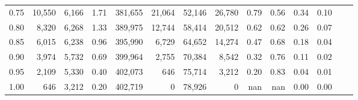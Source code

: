 \begin{tabular}{rrrrrrrrrrrrrr}
0.75 &  10,550 &  6,166 &    1.71 &  381,655 &   21,064 &  52,146 &  26,780 &  0.79 &  0.56 &  0.34 &      0.10 \\
0.80 &   8,320 &  6,268 &    1.33 &  389,975 &   12,744 &  58,414 &  20,512 &  0.62 &  0.62 &  0.26 &      0.07 \\
0.85 &   6,015 &  6,238 &    0.96 &  395,990 &    6,729 &  64,652 &  14,274 &  0.47 &  0.68 &  0.18 &      0.04 \\
0.90 &   3,974 &  5,732 &    0.69 &  399,964 &    2,755 &  70,384 &   8,542 &  0.32 &  0.76 &  0.11 &      0.02 \\
0.95 &   2,109 &  5,330 &    0.40 &  402,073 &      646 &  75,714 &   3,212 &  0.20 &  0.83 &  0.04 &      0.01 \\
1.00 &     646 &  3,212 &    0.20 &  402,719 &        0 &  78,926 &       0 &   nan &   nan &  0.00 &      0.00 \\
\bottomrule
\end{tabular}

